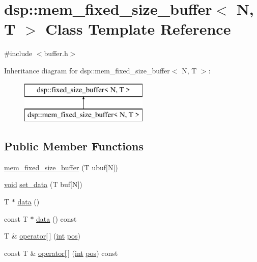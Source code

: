 \hypertarget{classdsp_1_1mem__fixed__size__buffer}{}\section{dsp\+:\+:mem\+\_\+fixed\+\_\+size\+\_\+buffer$<$ N, T $>$ Class Template Reference}
\label{classdsp_1_1mem__fixed__size__buffer}


{\ttfamily \#include $<$buffer.\+h$>$}

Inheritance diagram for dsp\+:\+:mem\+\_\+fixed\+\_\+size\+\_\+buffer$<$ N, T $>$\+:\begin{figure}[H]
\begin{center}
\leavevmode
\includegraphics[height=2.000000cm]{classdsp_1_1mem__fixed__size__buffer}
\end{center}
\end{figure}
\subsection*{Public Member Functions}
\begin{DoxyCompactItemize}
\item 
\hyperlink{classdsp_1_1mem__fixed__size__buffer_afcab7849f108bac63d9e4f7eb20032b3}{mem\+\_\+fixed\+\_\+size\+\_\+buffer} (T ubuf\mbox{[}N\mbox{]})
\item 
\hyperlink{tk_8h_aba408b7cd755a96426e004c015f5de8e}{void} \hyperlink{classdsp_1_1mem__fixed__size__buffer_a1ade90c3ddcbd1a4656990ce6d01d6c9}{set\+\_\+data} (T buf\mbox{[}N\mbox{]})
\item 
T $\ast$ \hyperlink{classdsp_1_1mem__fixed__size__buffer_a1c66f7515b8455167ab0d3c7a33c0a53}{data} ()
\item 
const T $\ast$ \hyperlink{classdsp_1_1mem__fixed__size__buffer_aa5229ad32bd8790de3d08a5a0a59f7af}{data} () const 
\item 
T \& \hyperlink{classdsp_1_1mem__fixed__size__buffer_af1b0a0bd7aa13ce032db9973c7cc9a12}{operator\mbox{[}$\,$\mbox{]}} (\hyperlink{tk_8h_a83f82f76e7fed06f4c49d2db94028a6d}{int} \hyperlink{wn_8c_a1910d262855b71da353ed0d07a6c7823}{pos})
\item 
const T \& \hyperlink{classdsp_1_1mem__fixed__size__buffer_a8bfa99040e15d638a458dc1c194d98ea}{operator\mbox{[}$\,$\mbox{]}} (\hyperlink{tk_8h_a83f82f76e7fed06f4c49d2db94028a6d}{int} \hyperlink{wn_8c_a1910d262855b71da353ed0d07a6c7823}{pos}) const 
\end{DoxyCompactItemize}
